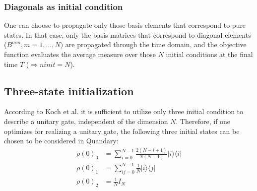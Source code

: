 \documentclass[11pt]{article}
\DeclareMathOperator{\Tr}{Tr}
\begin{document}
\subsubsection{Diagonals as initial condition}
One can choose to propagate only those basis elements that correspond to pure states. In that case, only the basis matrices that correspond
to diagonal elements ($B^{mm}, m=1,\dots,N)$ are propagated through the time
domain, and the objective function evaluates the average measure over those $N$
initial conditions at the final time $T$ ($\Rightarrow ninit = N$).


\subsection{Three-state initialization}
According to Koch et al. it is sufficient to utilize only three initial condition to describe a unitary gate, independent of the dimension $N$. Therefore, if one optimizes for realizing a unitary gate, the following three initial states can be chosen to be considered in Quandary:
\begin{align}
    \rho(0)_0 &= \sum_{i=0}^{N-1} \frac{2(N-i+1)}{N(N+1)} |i\rangle\langle i|\\
    \rho(0)_1 &= \sum_{ij=0}^{N-1} \frac{1}{N} |i\rangle\langle j|\\
    \rho(0)_2 &= \frac{1}{N} I_N
\end{align}
\end{document}
